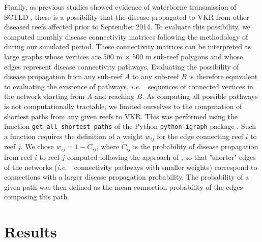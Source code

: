 \documentclass[preprint,12pt,authoryear]{elsarticle}
\newcommand{\ie}{{\it i.e.}\ }
\begin{document}
Finally, as previous studies showed evidence of waterborne transmission of SCTLD \citep{aeby2019pathogenesis, dobbelaere2020coupled,eaton2021measuring, meiling2021variable}, there is a possibility that the disease propagated to VKR from other diseased reefs affected prior to September 2014. To evaluate this possibility, we computed monthly disease connectivity matrices following the methodology of \cite{dobbelaere2020coupled} during our simulated period. These connectivity matrices can be interpreted as large graphs whose vertices are 500 m $\times$ 500 m sub-reef polygons and whose edges represent disease connectivity pathways. Evaluating the possibility of disease propagation from any sub-reef $A$ to any sub-reef $B$ is therefore equivalent to evaluating the existence of pathways, \ie~sequences of connected vertices in the network starting from $A$ and reaching $B$. As computing all possible pathways is not computationally tractable, we limited ourselves to the computation of shortest paths from any given reefs to VKR. This was performed using the function \texttt{get\_all\_shortest\_paths} of the Python \texttt{python-igraph} package \citep{csardi2006igraph}. Such a function requires the definition of a weight $w_{ij}$ for the edge connecting reef $i$ to reef $j$. We chose $w_{ij} = 1-\tilde{C}_{ij}$, where $\tilde{C}_{ij}$ is the probability of disease propagation from reef $i$ to reef $j$ computed following the approach of \cite{dobbelaere2020coupled}, so that "shorter" edges of the networks (\ie~connectivity pathways with smaller weights) correspond to connections with a larger disease propagation probability. The probability of a given path was then defined as the mean connection probability of the edges composing this path.


\section{Results}
\end{document}
